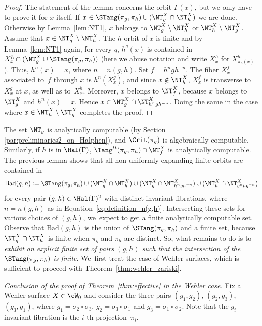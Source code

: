 \begin{proof}
The statement of the lemma concerns the orbit $\Gamma(x)$, but we only have to prove it for $x$ itself.
If $x\in \STang(\pi_g, \pi_h) \cup (\NT_g^X \cap \NT_h^X)$ we are done.
Otherwise by Lemma~\ref{lem:NT1}, $x$ belongs to
$\NT_g^X\setminus \NT_h^X$ or $\NT_h^X\setminus \NT_g^X$.
Assume that $x\in \NT_g^X\setminus \NT_h^X$.
The $h$-orbit of $x$ is finite and by Lemma~\ref{lem:NT1} again,
for every $q$, $h^q(x)$ is contained in
$X^h_{x}\cap (\NT_g^X \cup \STang(\pi_g, \pi_h))$ (here we abuse notation and
write $X^h_{x}$ for $X^h_{\pi_h(x)}$). Thus,
$h^{n}(x) = x$, where $n=n(g,h)$. Set $f = h^{n} g h^{-n}$. The fiber $X^f_x$ associated to~$f$ through $x$
is $h^{n}( X^g_x)$, and since $x\notin \NT_h^X$, $X^f_x$ is transverse to
$X^g_x$ at $x$, as well as to~$X^h_x$. Moreover, $x$ belongs to $\NT_f^X$, because $x$ belongs to $\NT_g^X$ and $h^n(x)=x$. Hence $x\in \NT_g^X\cap \NT_{h^ngh^{-n}}^X$. Doing the same
in the case where $x\in \NT_h^X\setminus \NT_g^X$ completes the proof.
\end{proof}

The set $\NT_g$ is analytically computable (by Section \ref{par:preliminaries2_on_Halphen}), and $\Crit(\pi_g)$ is algebraically computable. Similarly, if $h$ is in $\Hal(\Gamma)$, $\Tang^{tt}(\pi_g,\pi_h)\cap \NT_f^X$ is analytically computable.
The previous lemma
shows that all non uniformly expanding finite orbits are contained in
\[
\mathrm{Bad}(g,h):=\STang(\pi_g, \pi_h) \cup
(\NT_g^X\cap \NT_h^X)\cup (\NT_g^X\cap \NT_{h^n gh^{-n}}^X) \cup (\NT_h^X\cap \NT_{g^nhg^{-n}}^X)
\]
for every pair $(g,h)\in \Hal(\Gamma)^2$ with distinct invariant fibrations, where $n = n(g,h)$ as in Equation~\eqref{eq:definition_n(g,h)}.
Intersecting these sets for various choices of $(g,h)$, we~expect to get a finite analytically computable set.
Observe that $\mathrm{Bad}(g,h)$
is the union of $\STang(\pi_g, \pi_h)$ and a finite set, because $\NT_g^X\cap \NT_h^X$ is finite when $\pi_g$ and $\pi_h$ are distinct. So, what remains to do is to
\textit{exhibit an explicit finite set of pairs $(g,h)$ such that the
intersection of the $\STang(\pi_g, \pi_h)$ is finite}. We~first treat the case of Wehler surfaces,
which is sufficient to proceed with Theorem~\ref{thm:wehler_zariski}.

\smallskip

\noindent \textit{Conclusion of the proof of Theorem~\ref{thm:effective} in the Wehler case.}
Fix a Wehler surface $X\in {\cW}_0$ and consider the three pairs $(g_1, g_2)$, $(g_2,g_3)$, $(g_3,g_1)$, where $g_1 = \sigma_2\circ \sigma_3$, $g_2 = \sigma_3\circ\sigma_1$ and $g_3 =\sigma_1\circ\sigma_2$. Note that the $g_i$-invariant fibration is the $i$-th projection~$\pi_i$.

